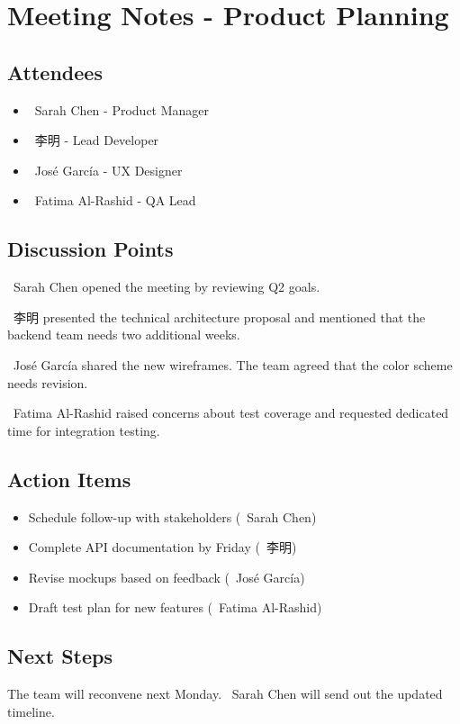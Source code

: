 \section{Meeting Notes - Product
Planning}\label{meeting-notes---product-planning}

\subsection{Attendees}\label{attendees}

\begin{itemize}
\tightlist
\item
  {\small \faUser\ Sarah Chen} - Product Manager
\item
  {\small \faUser\ 李明} - Lead Developer
\item
  {\small \faUser\ José García} - UX Designer
\item
  {\small \faUser\ Fatima Al-Rashid} - QA Lead
\end{itemize}

\subsection{Discussion Points}\label{discussion-points}

{\small \faUser\ Sarah Chen} opened the meeting by reviewing Q2 goals.

{\small \faUser\ 李明} presented the technical architecture proposal and
mentioned that the backend team needs two additional weeks.

{\small \faUser\ José García} shared the new wireframes. The team agreed
that the color scheme needs revision.

{\small \faUser\ Fatima Al-Rashid} raised concerns about test coverage
and requested dedicated time for integration testing.

\subsection{Action Items}\label{action-items}

\begin{itemize}
\tightlist
\item
  Schedule follow-up with stakeholders ({\small \faUser\ Sarah Chen})
\item
  Complete API documentation by Friday ({\small \faUser\ 李明})
\item
  Revise mockups based on feedback ({\small \faUser\ José García})
\item
  Draft test plan for new features ({\small \faUser\ Fatima Al-Rashid})
\end{itemize}

\subsection{Next Steps}\label{next-steps}

The team will reconvene next Monday. {\small \faUser\ Sarah Chen} will
send out the updated timeline.
